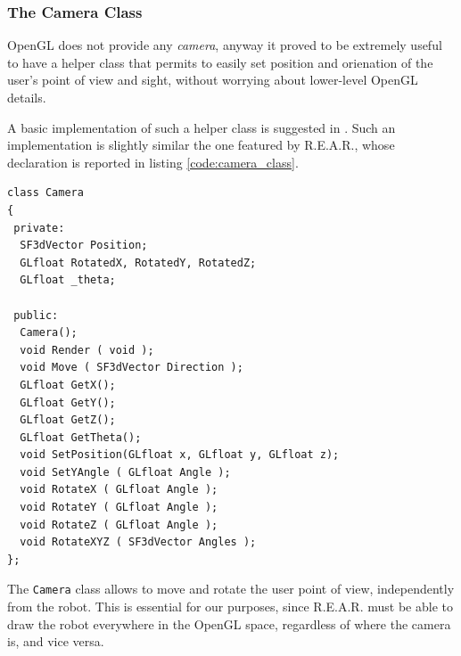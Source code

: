 

%

%
\subsubsection{The Camera Class}
\label{sub:cameraclass}
OpenGL does not provide any \textit{camera}, anyway it proved 
to be extremely useful to have a helper class that permits 
to easily set position and orienation of the user's 
point of view and sight, without worrying about lower-level 
OpenGL details.
%

%
A basic implementation of such a helper class is suggested 
in \cite{opengl:camera}. Such an implementation is slightly 
similar the one featured by \textsf{R.E.A.R.}, whose 
declaration is reported in listing \ref{code:camera_class}.
%
\begin{lstlisting}[caption={\texttt{Camera} class declaration}, label={code:camera_class}, frame=trBL]
class Camera
{
 private:
  SF3dVector Position;
  GLfloat RotatedX, RotatedY, RotatedZ;	
  GLfloat _theta;

 public:
  Camera();
  void Render ( void );
  void Move ( SF3dVector Direction );
  GLfloat GetX();
  GLfloat GetY();
  GLfloat GetZ();
  GLfloat GetTheta();
  void SetPosition(GLfloat x, GLfloat y, GLfloat z);
  void SetYAngle ( GLfloat Angle );
  void RotateX ( GLfloat Angle );
  void RotateY ( GLfloat Angle );
  void RotateZ ( GLfloat Angle );
  void RotateXYZ ( SF3dVector Angles );
};
\end{lstlisting}
%
The \texttt{Camera} class allows to move and rotate the user 
point of view, independently from the robot.
%
This is essential for our purposes, since \textsf{R.E.A.R.}
must be able to draw the robot everywhere in the OpenGL space, 
regardless of where the camera is, and vice versa.
%

